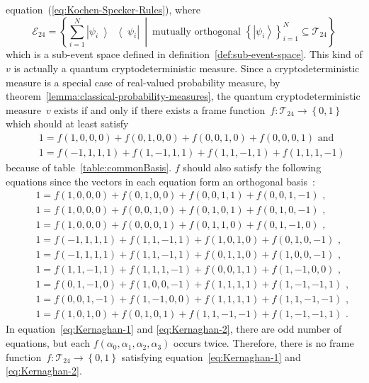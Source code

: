 \documentclass[reprint, aps, prl,superscriptaddress, showpacs,
showkeys]{revtex4-1}
\theoremstyle{plain}
\theoremstyle{definition}
\newcommand{\events}{\ensuremath{\mathcal{E}}}
\newcommand{\ket}[1]{{\left\vert{#1}\right\rangle}}
\newcommand{\op}[2]{\ensuremath{\left\vert{#1}\middle\rangle\middle\langle{#2}\right\vert}}
\newcommand{\proj}[1]{\op{#1}{#1}}
\newcommand{\set}[2]{\ensuremath{\left\{ {#1}~\middle|~{#2}\right\} }}
\begin{document}
equation~(\ref{eq:Kochen-Specker-Rules}), where 
\begin{equation}
\events_{24}=\set{\sum_{i=1}^{N}\proj{\psi_{i}}}{\textrm{mutually orthogonal }\left\{ \ket{\psi_{i}}\right\} _{i=1}^{N}\subseteq\mathcal{T}_{24}}
\end{equation}
which is a sub-event space defined in definition~\ref{def:sub-event-space}.
This kind of $v$ is actually a quantum cryptodeterministic measure.
Since a cryptodeterministic measure is a special case of real-valued
probability measure, by theorem~\ref{lemma:classical-probability-measures},
the quantum cryptodeterministic measure~$v$ exists if and only if
there exists a frame function~$f:\mathcal{T}_{24}\rightarrow\left\{ 0,1\right\} $
which should at least satisfy
\begin{eqnarray}
& & 1 = f(1, 0, 0, 0) + f(0, 1, 0, 0) + f(0, 0, 1, 0) + f(0, 0, 0, 1)\textrm{ and}\\
& & 1 = f(-1, 1, 1, 1) + f(1, -1, 1, 1) + f(1, 1, -1, 1) + f(1, 1, 1, -1)
\label{eq:Kernaghan-1}\end{eqnarray}
because of table~\ref{table:commonBasis}. $f$ should also satisfy
the following equations since the vectors in each equation form an
orthogonal basis~\cite{Kernaghan1994,peres1995quantum}:
\begin{eqnarray}
& & 1 = f(1, 0, 0, 0) + f(0, 1, 0, 0) + f(0, 0, 1, 1) + f(0, 0, 1, -1)\textrm{ ,}\\
& & 1 = f(1, 0, 0, 0) + f(0, 0, 1, 0) + f(0, 1, 0, 1) + f(0, 1, 0, -1)\textrm{ ,}\\
& & 1 = f(1, 0, 0, 0) + f(0, 0, 0, 1) + f(0, 1, 1, 0) + f(0, 1, -1, 0)\textrm{ ,}\\
& & 1 = f(-1, 1, 1, 1) + f(1, 1, -1, 1) + f(1, 0, 1, 0) + f(0, 1, 0, -1)\textrm{ ,}\\
& & 1 = f(-1, 1, 1, 1) + f(1, 1, -1, 1) + f(0, 1, 1, 0) + f(1, 0, 0, -1)\textrm{ ,}\\
& & 1 = f(1, 1, -1, 1) + f(1, 1, 1, -1) + f(0, 0, 1, 1) + f(1, -1, 0, 0)\textrm{ ,}\\
& & 1 = f(0, 1, -1, 0) + f(1, 0, 0, -1) + f(1, 1, 1, 1) + f(1, -1, -1, 1)\textrm{ ,}\\
& & 1 = f(0, 0, 1, -1) + f(1, -1, 0, 0) + f(1, 1, 1, 1) + f(1, 1, -1, -1)\textrm{ ,}\\
& & 1 = f(1, 0, 1, 0) + f(0, 1, 0, 1) + f(1, 1, -1, -1) + f(1, -1, -1, 1)\textrm{ .}
\label{eq:Kernaghan-2}\end{eqnarray}
In equation~\ref{eq:Kernaghan-1} and \ref{eq:Kernaghan-2}, there
are odd number of equations, but each $f\left(\alpha_{0},\alpha_{1},\alpha_{2},\alpha_{3}\right)$
occurs twice. Therefore, there is no frame function~$f:\mathcal{T}_{24}\rightarrow\left\{ 0,1\right\} $
satisfying equation~\ref{eq:Kernaghan-1} and \ref{eq:Kernaghan-2}.
\end{document}
